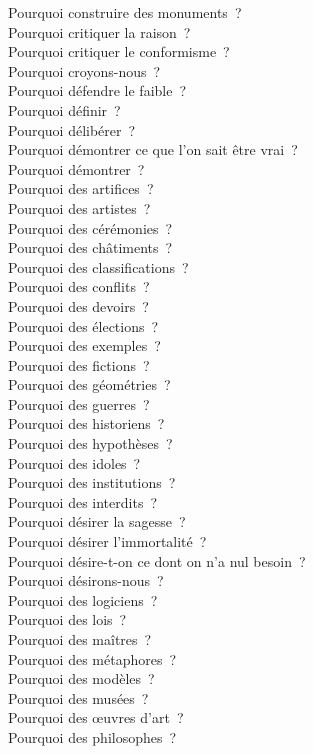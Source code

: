 \documentclass[a4paper,12pt]{article}
\begin{document}
Pourquoi construire des monuments ? \\
Pourquoi critiquer la raison ? \\
Pourquoi critiquer le conformisme ? \\
Pourquoi croyons-nous ? \\
Pourquoi défendre le faible ? \\
Pourquoi définir ? \\
Pourquoi délibérer ? \\
Pourquoi démontrer ce que l'on sait être vrai ? \\
Pourquoi démontrer ? \\
Pourquoi des artifices ? \\
Pourquoi des artistes ? \\
Pourquoi des cérémonies ? \\
Pourquoi des châtiments ? \\
Pourquoi des classifications ? \\
Pourquoi des conflits ? \\
Pourquoi des devoirs ? \\
Pourquoi des élections ? \\
Pourquoi des exemples ? \\
Pourquoi des fictions ? \\
Pourquoi des géométries ? \\
Pourquoi des guerres ? \\
Pourquoi des historiens ? \\
Pourquoi des hypothèses ? \\
Pourquoi des idoles ? \\
Pourquoi des institutions ? \\
Pourquoi des interdits ? \\
Pourquoi désirer la sagesse ? \\
Pourquoi désirer l'immortalité ? \\
Pourquoi désire-t-on ce dont on n'a nul besoin ? \\
Pourquoi désirons-nous ? \\
Pourquoi des logiciens ? \\
Pourquoi des lois ? \\
Pourquoi des maîtres ? \\
Pourquoi des métaphores ? \\
Pourquoi des modèles ? \\
Pourquoi des musées ? \\
Pourquoi des œuvres d'art ? \\
Pourquoi des philosophes ? \\
\end{document}
